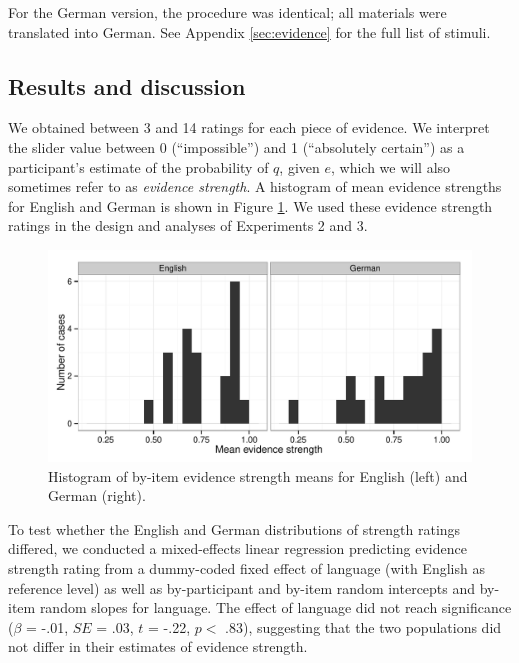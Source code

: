 \documentclass[11pt]{article}
\newcommand{\red}[1]{\textcolor{Red}{#1}}
\newcommand{\figref}[1]{Figure \ref{#1}}
\newcommand{\appref}[1]{Appendix \ref{#1}}
\begin{document}
For the German version, the procedure was identical; all materials were translated into German. See \appref{sec:evidence} for the full list of stimuli.

\subsection{Results and discussion}

We obtained between 3 and 14 ratings for each piece of evidence. We interpret the slider value between 0 (``impossible'') and 1 (``absolutely certain'') as a participant's estimate of the probability of $q$, given $e$, which we will also sometimes refer to as  \emph{evidence strength}. A histogram of mean evidence strengths for English and German is shown in \figref{fig:evidencestrength}.  We used these evidence strength ratings in the design and analyses of Experiments 2 and 3.

\begin{figure}
\centering
\includegraphics[width=.9\textwidth]{pics/evidencestrength-histograms}
\caption{Histogram of by-item evidence strength means  for English (left) and German (right).}
\label{fig:evidencestrength}
\end{figure}



To test whether the English and German distributions of strength ratings differed, we conducted a mixed-effects linear regression predicting evidence strength rating from a dummy-coded fixed effect of language (with English as reference level) as well as by-participant and by-item random intercepts and by-item random slopes for language. The effect of language did not reach significance ($\beta$ = -.01, $SE$ = .03, $t$ = -.22, $p <$ .83), suggesting that the two populations did not differ in their estimates of evidence strength.   
\end{document}
